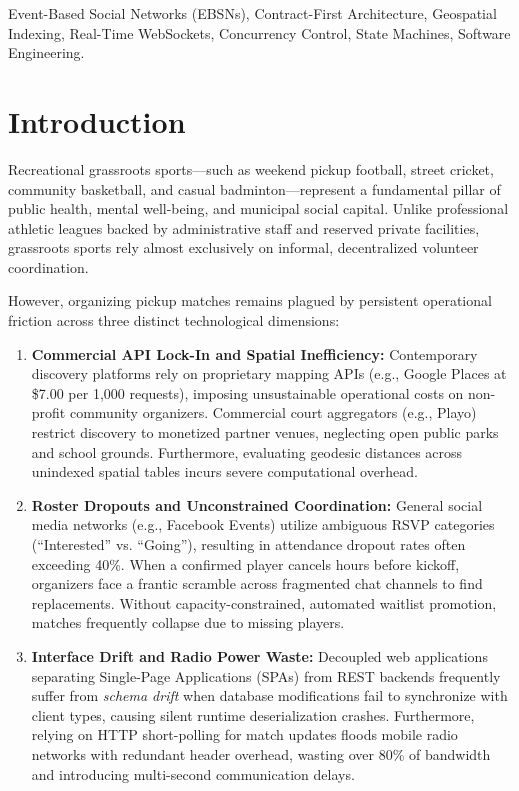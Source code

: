 \documentclass[conference]{IEEEtran}
\begin{document}
\begin{IEEEkeywords}
Event-Based Social Networks (EBSNs), Contract-First Architecture, Geospatial Indexing, Real-Time WebSockets, Concurrency Control, State Machines, Software Engineering.
\end{IEEEkeywords}

\section{Introduction}

Recreational grassroots sports—such as weekend pickup football, street cricket, community basketball, and casual badminton—represent a fundamental pillar of public health, mental well-being, and municipal social capital. Unlike professional athletic leagues backed by administrative staff and reserved private facilities, grassroots sports rely almost exclusively on informal, decentralized volunteer coordination.

However, organizing pickup matches remains plagued by persistent operational friction across three distinct technological dimensions:
\begin{enumerate}
    \item \textbf{Commercial API Lock-In and Spatial Inefficiency:} Contemporary discovery platforms rely on proprietary mapping APIs (e.g., Google Places at \$7.00 per 1,000 requests), imposing unsustainable operational costs on non-profit community organizers. Commercial court aggregators (e.g., Playo) restrict discovery to monetized partner venues, neglecting open public parks and school grounds. Furthermore, evaluating geodesic distances across unindexed spatial tables incurs severe computational overhead.
    \item \textbf{Roster Dropouts and Unconstrained Coordination:} General social media networks (e.g., Facebook Events) utilize ambiguous RSVP categories (``Interested'' vs. ``Going''), resulting in attendance dropout rates often exceeding 40\%. When a confirmed player cancels hours before kickoff, organizers face a frantic scramble across fragmented chat channels to find replacements. Without capacity-constrained, automated waitlist promotion, matches frequently collapse due to missing players.
    \item \textbf{Interface Drift and Radio Power Waste:} Decoupled web applications separating Single-Page Applications (SPAs) from REST backends frequently suffer from \textit{schema drift} when database modifications fail to synchronize with client types, causing silent runtime deserialization crashes. Furthermore, relying on HTTP short-polling for match updates floods mobile radio networks with redundant header overhead, wasting over 80\% of bandwidth and introducing multi-second communication delays.
\end{enumerate}
\end{document}
